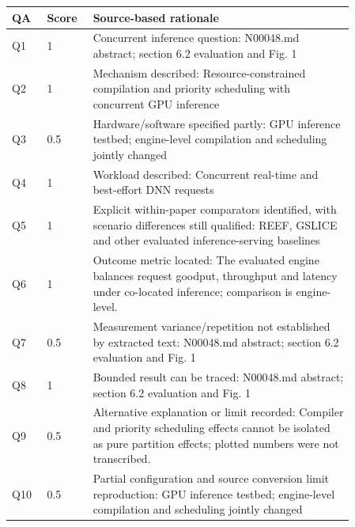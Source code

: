 \begin{longtable}{P{0.09\linewidth}P{0.10\linewidth}P{0.67\linewidth}}
\toprule QA & Score & Source-based rationale\\\midrule\endhead
Q1 & 1 & Concurrent inference question: N00048.md abstract; section 6.2 evaluation and Fig. 1\\
Q2 & 1 & Mechanism described: Resource-constrained compilation and priority scheduling with concurrent GPU inference\\
Q3 & 0.5 & Hardware/software specified partly: GPU inference testbed; engine-level compilation and scheduling jointly changed\\
Q4 & 1 & Workload described: Concurrent real-time and best-effort DNN requests\\
Q5 & 1 & Explicit within-paper comparators identified, with scenario differences still qualified: REEF, GSLICE and other evaluated inference-serving baselines\\
Q6 & 1 & Outcome metric located: The evaluated engine balances request goodput, throughput and latency under co-located inference; comparison is engine-level.\\
Q7 & 0.5 & Measurement variance/repetition not established by extracted text: N00048.md abstract; section 6.2 evaluation and Fig. 1\\
Q8 & 1 & Bounded result can be traced: N00048.md abstract; section 6.2 evaluation and Fig. 1\\
Q9 & 0.5 & Alternative explanation or limit recorded: Compiler and priority scheduling effects cannot be isolated as pure partition effects; plotted numbers were not transcribed.\\
Q10 & 0.5 & Partial configuration and source conversion limit reproduction: GPU inference testbed; engine-level compilation and scheduling jointly changed\\
\bottomrule\end{longtable}

